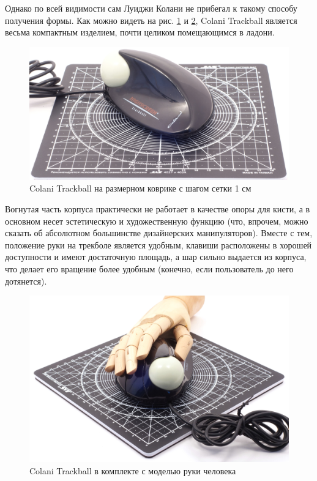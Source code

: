 \documentclass[11pt, a4paper]{article}
\begin{document}
Однако по всей видимости сам Луиджи Колани не прибегал к такому способу получения формы. Как можно видеть на рис. \ref{fig:ColaniSize} и \ref{fig:ColaniHand}, Colani Trackball является весьма компактным изделием, почти целиком помещающимся в ладони.

\begin{figure}[h]
    \centering
    \includegraphics[scale=0.5]{1993_colani_trackball/size_30.jpg}
    \caption{Colani Trackball на размерном коврике с шагом сетки 1 см}
    \label{fig:ColaniSize}
\end{figure}

Вогнутая часть корпуса практически не работает в качестве опоры для кисти, а в основном несет эстетическую и художественную функцию (что, впрочем, можно сказать об абсолютном большинстве дизайнерских манипуляторов). Вместе с тем, положение руки на трекболе является удобным, клавиши расположены в хорошей доступности и имеют достаточную площадь, а шар сильно выдается из корпуса, что делает его вращение более удобным (конечно, если пользователь до него дотянется).

\begin{figure}[h]
    \centering
    \includegraphics[scale=0.15]{1993_colani_trackball/hand_60.jpg}
    \caption{Colani Trackball в комплекте с моделью руки человека}
    \label{fig:ColaniHand}
\end{figure}
\end{document}
